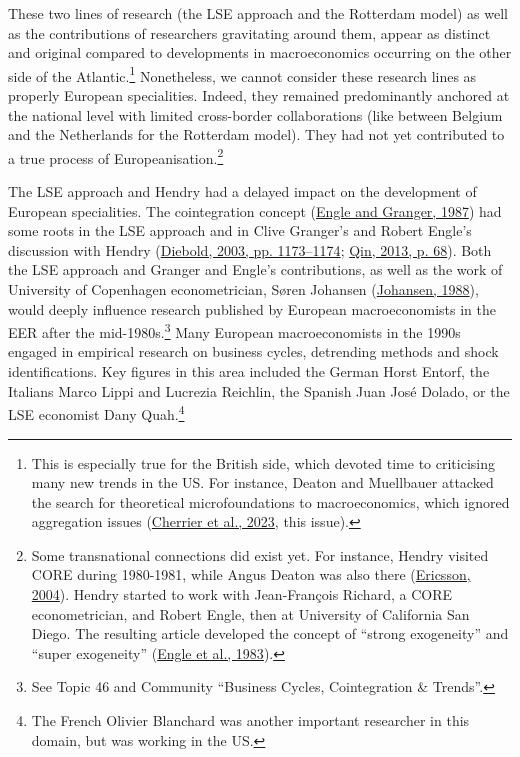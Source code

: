 \documentclass[
  12pt,
  onecolumn]{article}
\begin{document}
These two lines of research (the LSE approach and the Rotterdam model) as well as the contributions of researchers gravitating around them, appear as distinct and original compared to developments in macroeconomics occurring on the other side of the Atlantic.\footnote{This is especially true for the British side, which devoted time to criticising many new trends in the US. For instance, Deaton and Muellbauer attacked the search for theoretical microfoundations to macroeconomics, which ignored aggregation issues (\protect\hyperlink{ref-cherrier2023}{Cherrier et al., 2023}, this issue).} Nonetheless, we cannot consider these research lines as properly European specialities. Indeed, they remained predominantly anchored at the national level with limited cross-border collaborations (like between Belgium and the Netherlands for the Rotterdam model). They had not yet contributed to a true process of Europeanisation.\footnote{Some transnational connections did exist yet. For instance, Hendry visited CORE during 1980-1981, while Angus Deaton was also there (\protect\hyperlink{ref-ericsson2004}{Ericsson, 2004}). Hendry started to work with Jean-François Richard, a CORE econometrician, and Robert Engle, then at University of California San Diego. The resulting article developed the concept of ``strong exogeneity'' and ``super exogeneity'' (\protect\hyperlink{ref-engle1983}{Engle et al., 1983}).}

The LSE approach and Hendry had a delayed impact on the development of European specialities. The cointegration concept (\protect\hyperlink{ref-engle1987}{Engle and Granger, 1987}) had some roots in the LSE approach and in Clive Granger's and Robert Engle's discussion with Hendry (\protect\hyperlink{ref-diebold2003}{Diebold, 2003, pp. 1173--1174}; \protect\hyperlink{ref-qin2013a}{Qin, 2013, p. 68}). Both the LSE approach and Granger and Engle's contributions, as well as the work of University of Copenhagen econometrician, Søren Johansen (\protect\hyperlink{ref-johansen1988}{Johansen, 1988}), would deeply influence research published by European macroeconomists in the EER after the mid-1980s.\footnote{See Topic 46 and Community ``Business Cycles, Cointegration \& Trends''.} Many European macroeconomists in the 1990s engaged in empirical research on business cycles, detrending methods and shock identifications. Key figures in this area included the German Horst Entorf, the Italians Marco Lippi and Lucrezia Reichlin, the Spanish Juan José Dolado, or the LSE economist Dany Quah.\footnote{The French Olivier Blanchard was another important researcher in this domain, but was working in the US.}
\end{document}
